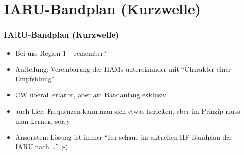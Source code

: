 \section{IARU-Bandplan (Kurzwelle)}

\begin{frame}
  \frametitle{IARU-Bandplan (Kurzwelle)}


  \begin{itemize}
    \item Bei uns Region 1 -- remember?
    \item Aufteilung: Vereinbarung der HAMs untereinander mit ``Charakter
      einer Empfehlung''
    \item CW überall erlaubt, aber am Bandanfang exklusiv
    \item auch hier: Frequenzen kann man sich etwas herleiten, aber im
      Prinzip muss man Lernen, sorry
    \item Ansonsten: Lösung ist immer ``Ich schaue im aktuellen HF-Bandplan
      der IARU nach \ldots'' ;-)
  \end{itemize}

\end{frame}



